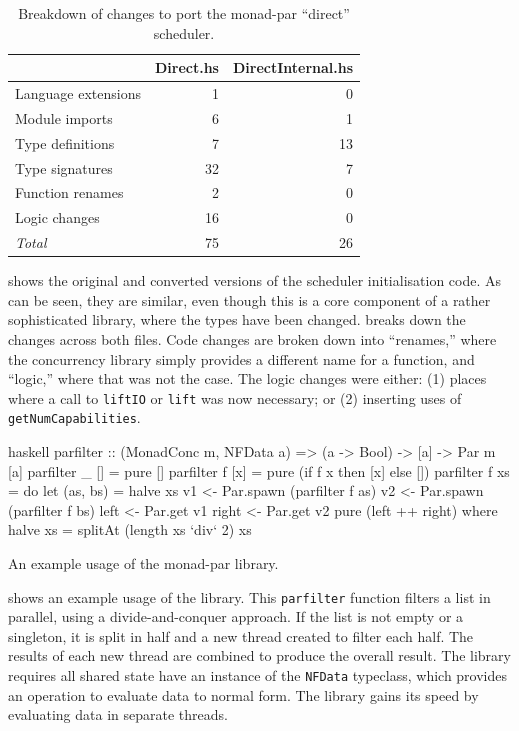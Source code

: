 \begin{table}
  \centering
  \begin{tabular}{lrr} \toprule
    & Direct.hs & DirectInternal.hs \\ \midrule
    Language extensions & 1 & 0 \\
    Module imports & 6 & 1 \\
    Type definitions & 7 & 13 \\
    Type signatures & 32 & 7 \\
    Function renames & 2 & 0 \\
    Logic changes & 16 & 0 \\ \midrule
    \emph{Total} & 75 & 26 \\ \bottomrule
  \end{tabular}
  \caption{Breakdown of changes to port the monad-par ``direct'' scheduler.}\label{tbl:parmonad_diff}
\end{table}

 shows the original and converted versions of the
scheduler initialisation code.  As can be seen, they are similar, even
though this is a core component of a rather sophisticated library,
where the types have been changed.   breaks
down the changes across both files.  Code changes are broken down into
``renames,'' where the concurrency library simply provides a different
name for a function, and ``logic,'' where that was not the case.  The
logic changes were either: (1) places where a call to \verb|liftIO| or
\verb|lift| was now necessary; or (2) inserting uses of
\verb|getNumCapabilities|.

\begin{listing}
\centering
\begin{cminted}{haskell}
parfilter :: (MonadConc m, NFData a) => (a -> Bool) -> [a] -> Par m [a]
parfilter _ []  = pure []
parfilter f [x] = pure (if f x then [x] else [])
parfilter f xs  = do
    let (as, bs) = halve xs
    v1 <- Par.spawn (parfilter f as)
    v2 <- Par.spawn (parfilter f bs)
    left  <- Par.get v1
    right <- Par.get v2
    pure (left ++ right)
  where
    halve xs = splitAt (length xs `div` 2) xs
\end{cminted}
\caption{An example usage of the monad-par library.}\label{lst:parmonad_example1}
\end{listing}

 shows an example usage of the library.
This \verb|parfilter| function filters a list in parallel, using a
divide-and-conquer approach.  If the list is not empty or a singleton,
it is split in half and a new thread created to filter each half.  The
results of each new thread are combined to produce the overall result.
The library requires all shared state have an instance of the
\verb|NFData| typeclass, which provides an operation to evaluate data
to normal form.  The library gains its speed by evaluating data in
separate threads.

